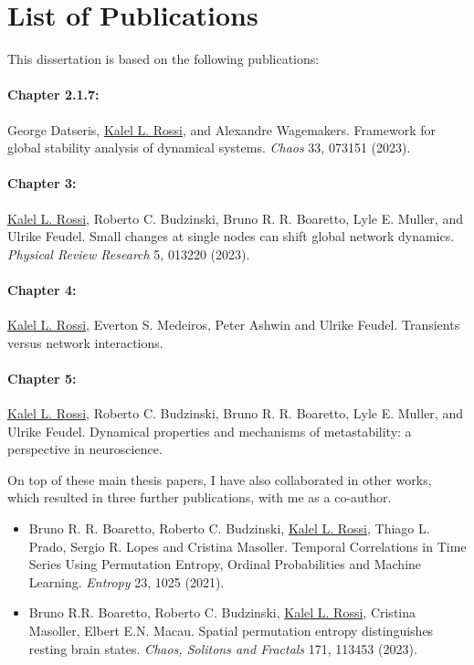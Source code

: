 
\section*{List of Publications}
This dissertation is based on the following publications:


\paragraph{Chapter 2.1.7:}
George Datseris, \underline{Kalel L. Rossi}, and Alexandre Wagemakers. Framework for global stability analysis of dynamical systems. \textit{Chaos} 33, 073151 (2023).

\paragraph{Chapter 3:}
\underline{Kalel L. Rossi}, Roberto C. Budzinski, Bruno R. R. Boaretto, Lyle E. Muller, and Ulrike Feudel.  Small changes at single nodes can shift global network dynamics. \textit{Physical Review Research} 5, 013220 (2023). 

\paragraph{Chapter 4:}
\underline{Kalel L. Rossi}, Everton S. Medeiros, Peter Ashwin and Ulrike Feudel. Transients versus network interactions.

\paragraph{Chapter 5:}
\underline{Kalel L. Rossi}, Roberto C. Budzinski, Bruno R. R. Boaretto, Lyle E. Muller, and Ulrike Feudel. Dynamical properties and mechanisms of metastability: a perspective in neuroscience. 

\vspace{1cm}


On top of these main thesis papers, I have also collaborated in other works, which resulted in three further publications, with me as a co-author.
\begin{itemize}
    \item Bruno R. R. Boaretto, Roberto C. Budzinski, \underline{Kalel L. Rossi}, Thiago L. Prado, Sergio R. Lopes and Cristina Masoller. Temporal Correlations in Time Series Using Permutation Entropy, Ordinal Probabilities and Machine Learning. \textit{Entropy} 23, 1025 (2021).
    \item Bruno R.R. Boaretto, Roberto C. Budzinski, \underline{Kalel L. Rossi}, Cristina Masoller, Elbert E.N. Macau. Spatial permutation entropy distinguishes resting brain states. \textit{Chaos, Solitons and Fractals} 171, 113453 (2023).
\end{itemize}